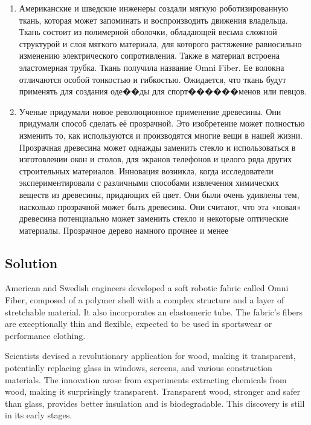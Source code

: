 \begin{enumerate}
      \item Американские и шведские инженеры создали мягкую роботизированную ткань, которая
            может запоминать и воспроизводить движения владельца. Ткань состоит из полимерной
            оболочки, обладающей весьма сложной структурой и слоя мягкого материала, для которого
            растяжение равносильно изменению электрического сопротивления. Также в материал
            встроена эластомерная трубка. Ткань получила название Omni Fiber. Ее волокна отличаются
            особой тонкостью и гибкостью. Ожидается, что ткань будут применять для создания оде��ды
            для спорт������менов или певцов.

      \item Ученые придумали новое революционное применение древесины. Они придумали способ
            сделать её прозрачной. Это изобретение может полностью изменить то, как используются и
            производятся многие вещи в нашей жизни. Прозрачная древесина может однажды заменить
            стекло и использоваться в изготовлении окон и столов, для экранов телефонов и целого ряда
            других строительных материалов. Инновация возникла, когда исследователи
            экспериментировали с различными способами извлечения химических веществ из
            древесины, придающих ей цвет. Они были очень удивлены тем, насколько прозрачной может
            быть древесина. Они считают, что эта «новая» древесина потенциально может заменить
            стекло и некоторые оптические материалы. Прозрачное дерево намного прочнее и менее
\end{enumerate}

\subsection*{Solution}
American and Swedish engineers developed a soft robotic fabric called Omni Fiber, composed of a polymer shell with a complex structure and a layer of stretchable material. It also incorporates an elastomeric tube. The fabric's fibers are exceptionally thin and flexible, expected to be used in sportswear or performance clothing.

Scientists devised a revolutionary application for wood, making it transparent, potentially replacing glass in windows, screens, and various construction materials. The innovation arose from experiments extracting chemicals from wood, making it surprisingly transparent. Transparent wood, stronger and safer than glass, provides better insulation and is biodegradable. This discovery is still in its early stages.

